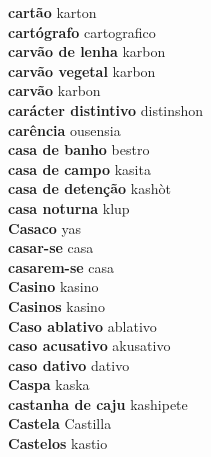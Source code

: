 \textbf{ cartão  } karton \\
\textbf{ cartógrafo  } cartografico \\
\textbf{ carvão de lenha  } karbon \\
\textbf{ carvão vegetal  } karbon \\
\textbf{ carvão  } karbon \\
\textbf{ carácter distintivo  } distinshon \\
\textbf{ carência  } ousensia \\
\textbf{ casa de banho  } bestro \\
\textbf{ casa de campo  } kasita \\
\textbf{ casa de detenção  } kashòt \\
\textbf{ casa noturna  } klup \\
\textbf{ Casaco  } yas \\
\textbf{ casar-se  } casa \\
\textbf{ casarem-se  } casa \\
\textbf{ Casino  } kasino \\
\textbf{ Casinos  } kasino \\
\textbf{ Caso ablativo  } ablativo \\
\textbf{ caso acusativo  } akusativo \\
\textbf{ caso dativo  } dativo \\
\textbf{ Caspa  } kaska \\
\textbf{ castanha de caju  } kashipete \\
\textbf{ Castela  } Castilla \\
\textbf{ Castelos  } kastio \\

